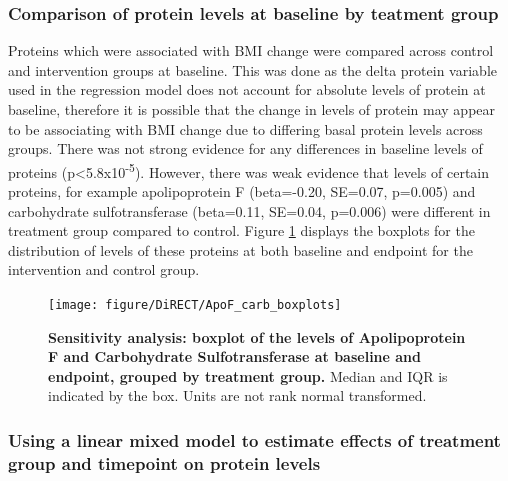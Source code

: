 \documentclass[11pt,twoside]{bristolthesis}
\begin{document}
\hypertarget{comparison-of-protein-levels-at-baseline-by-teatment-group}{%
\subsubsection{Comparison of protein levels at baseline by teatment group}\label{comparison-of-protein-levels-at-baseline-by-teatment-group}}

Proteins which were associated with BMI change were compared across control and intervention groups at baseline. This was done as the delta protein variable used in the regression model does not account for absolute levels of protein at baseline, therefore it is possible that the change in levels of protein may appear to be associating with BMI change due to differing basal protein levels across groups. There was not strong evidence for any differences in baseline levels of proteins (p\textless5.8x10\textsuperscript{-5}). However, there was weak evidence that levels of certain proteins, for example apolipoprotein F (beta=-0.20, SE=0.07, p=0.005) and carbohydrate sulfotransferase (beta=0.11, SE=0.04, p=0.006) were different in treatment group compared to control. Figure \ref{fig:ApoF-carb-boxplot} displays the boxplots for the distribution of levels of these proteins at both baseline and endpoint for the intervention and control group.



\begin{figure}
\texttt{[image: figure/DiRECT/ApoF\_carb\_boxplots]} \caption[Sensitivity analysis: boxplot of the levels of Apolipoprotein F and Carbohydrate Sulfotransferase at baseline and endpoint, grouped by treatment group.]{\textbf{Sensitivity analysis: boxplot of the levels of Apolipoprotein F and Carbohydrate Sulfotransferase at baseline and endpoint, grouped by treatment group.} Median and IQR is indicated by the box. Units are not rank normal transformed.}\label{fig:ApoF-carb-boxplot}
\end{figure}
\hypertarget{using-a-linear-mixed-model-to-estimate-effects-of-treatment-group-and-timepoint-on-protein-levels}{%
\subsubsection{Using a linear mixed model to estimate effects of treatment group and timepoint on protein levels}\label{using-a-linear-mixed-model-to-estimate-effects-of-treatment-group-and-timepoint-on-protein-levels}}
\end{document}
